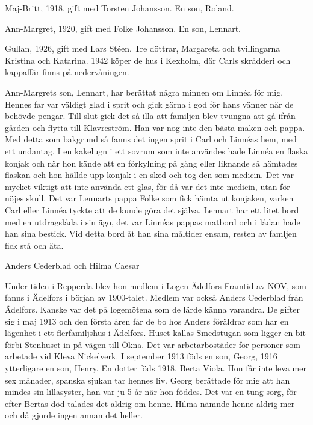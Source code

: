 Maj-Britt, 1918, gift med Torsten Johansson. En son, Roland.


Ann-Margret, 1920, gift med Folke Johansson. En son, Lennart.


Gullan, 1926, gift med Lars Stéen. Tre döttrar, Margareta och tvillingarna Kristina och Katarina.
1942 köper de hus i Kexholm, där Carls skrädderi och kappaffär finns på nedervåningen.


Ann-Margrets son, Lennart, har berättat några minnen om Linnéa för mig. Hennes far var väldigt glad i sprit och gick gärna i god för hans vänner när de behövde pengar. Till slut gick det så illa att familjen blev tvungna att gå ifrån gården och flytta till Klavreström. Han var nog inte den bästa maken och pappa.
Med detta som bakgrund så fanns det ingen sprit i Carl och Linnéas hem, med ett undantag. I en kakelugn i ett sovrum som inte användes hade Linnéa en flaska konjak och när hon kände att en förkylning på gång eller liknande så hämtades flaskan och hon hällde upp konjak i en sked och tog den som medicin. Det var mycket viktigt att inte använda ett glas, för då var det inte medicin, utan för nöjes skull. Det var Lennarts pappa Folke som fick hämta ut konjaken, varken Carl eller Linnéa tyckte att de kunde göra det själva.
Lennart har ett litet bord med en utdragslåda i sin ägo, det var Linnéas pappas matbord och i lådan hade han sina bestick. Vid detta bord åt han sina måltider ensam, resten av famljen fick stå och äta.








Anders Cederblad och Hilma Caesar


Under tiden i Repperda blev hon medlem i Logen Ädelfors Framtid av NOV, som fanns i Ädelfors i början av 1900-talet. Medlem var också Anders Cederblad från Ädelfors. Kanske var det på logemötena som de lärde känna varandra.
De gifter sig i maj 1913 och den första åren får de bo hos Anders föräldrar som har en lägenhet i ett flerfamiljshus i Ädelfors. Huset kallas Smedstugan som ligger en bit förbi Stenhuset in på vägen till Ökna. Det var arbetarbostäder för personer som arbetade vid Kleva Nickelverk.
I september 1913 föds en son, Georg, 1916 ytterligare en son, Henry. En dotter föds 1918, Berta Viola. Hon får inte leva mer sex månader, spanska sjukan tar hennes liv. 
Georg berättade för mig att han mindes sin lillasyster, han var ju 5 år när hon föddes.
Det var en tung sorg, för efter Bertas död talades det aldrig om henne. Hilma nämnde henne aldrig mer och då gjorde ingen annan det heller.


